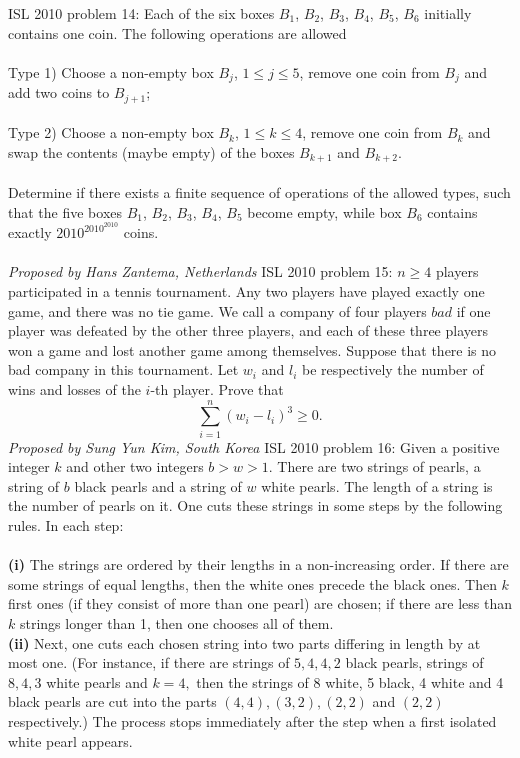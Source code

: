 ISL 2010 problem 14:  Each of the six boxes $B_1$, $B_2$, $B_3$, $B_4$, $B_5$, $B_6$ initially contains one coin. The following operations are allowed \\\\
Type 1) Choose a non-empty box $B_j$, $1\leq j \leq 5$, remove one coin from $B_j$ and add two coins to $B_{j+1}$; \\\\
Type 2) Choose a non-empty box $B_k$, $1\leq k \leq 4$, remove one coin from $B_k$ and swap the contents (maybe empty) of the boxes $B_{k+1}$ and $B_{k+2}$. \\\\
Determine if there exists a finite sequence of operations of the allowed types, such that the five boxes $B_1$, $B_2$, $B_3$, $B_4$, $B_5$ become empty, while box $B_6$ contains exactly $2010^{2010^{2010}}$ coins. \\\\
\textit{Proposed by Hans Zantema, Netherlands} 
ISL 2010 problem 15:  $n \geq 4$ players participated in a tennis tournament. Any two players have played exactly one game, and there was no tie game. We call a company of four players $bad$ if one player was defeated by the other three players, and each of these three players won a game and lost another game among themselves. Suppose that there is no bad company in this tournament. Let $w_i$ and $l_i$ be respectively the number of wins and losses of the $i$-th player. Prove that
\[ \sum^n_{i=1} \left(w_i - l_i\right)^3 \geq 0. \]
\textit{Proposed by Sung Yun Kim, South Korea} 
ISL 2010 problem 16:  Given a positive integer $k$ and other two integers $b > w > 1.$ There are two strings of pearls, a string of $b$ black pearls and a string of $w$ white pearls. The length of a string is the number of pearls on it. One cuts these strings in some steps by the following rules. In each step: \\\\
\textbf{(i)} The strings are ordered by their lengths in a non-increasing order. If there are some strings of equal lengths, then the white ones precede the black ones. Then $k$ first ones (if they consist of more than one pearl) are chosen; if there are less than $k$ strings longer than 1, then one chooses all of them. \\
\textbf{(ii)} Next, one cuts each chosen string into two parts differing in length by at most one. (For instance, if there are strings of $5, 4, 4, 2$ black pearls, strings of $8, 4, 3$ white pearls and $k = 4,$ then the strings of 8 white, 5 black, 4 white and 4 black pearls are cut into the parts $(4,4), (3,2), (2,2)$ and $(2,2)$ respectively.) The process stops immediately after the step when a first isolated white pearl appears. \\\\
